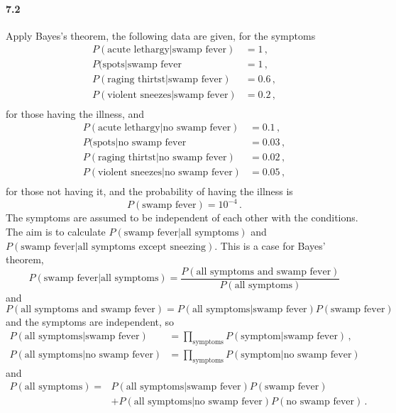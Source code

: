 \documentclass[a4paper,12pt]{article}
\begin{document}
\paragraph{7.2} Apply Bayes's theorem, the following data are given, for the symptoms
\[
 \begin{aligned}
  P(\text{acute lethargy}|\text{swamp fever}) &= 1\,,\\
  P(\text{spots} | \text{swamp fever} &= 1\,,\\
  P(\text{raging thirtst}|\text{swamp fever}) &= 0.6\,,\\
  P(\text{violent sneezes}| \text{swamp fever}) &= 0.2\,,\\
 \end{aligned}
\]
for those having the illness, and
\[
 \begin{aligned}
  P(\text{acute lethargy}|\text{no swamp fever}) &= 0.1\,,\\
  P(\text{spots} | \text{no swamp fever} &= 0.03\,,\\
  P(\text{raging thirtst}|\text{no swamp fever}) &= 0.02\,,\\
  P(\text{violent sneezes}| \text{no swamp fever}) &= 0.05\,,\\
 \end{aligned}
\]
for those not having it, and the probability of having the illness is
\[
 P(\text{swamp fever}) = 10^{-4}\,.
\]
The symptoms are assumed to be independent of each other with the conditions. The aim is to calculate $P(\text{swamp fever} | \text{all symptoms})$ and $P(\text{swamp fever}| \text{all symptoms except sneezing})$. This is a case for Bayes' theorem,
\[
 P(\text{swamp fever}|\text{all symptoms}) = \frac{P(\text{all symptoms and swamp fever})}{P(\text{all symptoms})}
\]
and
\[
 P(\text{all symptoms and swamp fever}) = P(\text{all symptoms} | \text{swamp fever}) P(\text{swamp fever})
\]
and the symptoms are independent, so
\[
 \begin{aligned}
  P(\text{all symptoms}|\text{swamp fever}) &= \prod_{\text{symptoms}} P(\text{symptom}|\text{swamp fever})\,,\\
  P(\text{all symptoms}|\text{no swamp fever}) &= \prod_{\text{symptoms}} P(\text{symptom}|\text{no swamp fever})
 \end{aligned}
\]
and
\[
 \begin{aligned}
  P(\text{all symptoms}) = &P(\text{all symptoms}|\text{swamp fever}) P(\text{swamp fever})\\ &+ P(\text{all symptoms}|\text{no swamp fever}) P(\text{no swamp fever})\,.
 \end{aligned}
\]
\end{document}
